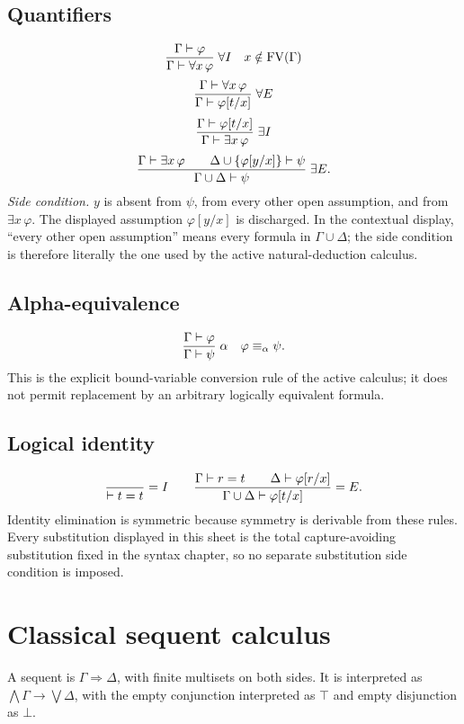 \documentclass[11pt,oneside,openany]{book}
\theoremstyle{definition}
\theoremstyle{plain}
\theoremstyle{remark}
\DeclarePairedDelimiter{\set}{\lbrace}{\rbrace}
\newcommand{\FV}{\operatorname{FV}}
\newcommand{\derives}{\vdash}
\newcommand{\bottom}{\bot}
\newcommand{\topv}{\top}
\newcommand{\Rule}[3][]{\frac{#2}{#3}\;\textsc{#1}}
\newcommand{\side}[1]{\quad\text{#1}}
\begin{document}
\subsection*{Quantifiers}
\[
\Rule[\(\forall I\)]{\Gamma\derives\varphi}
{\Gamma\derives\forall x\,\varphi}
\side{\(x\notin\FV(\Gamma)\)}
\]
\[
\Rule[\(\forall E\)]{\Gamma\derives\forall x\,\varphi}
{\Gamma\derives\varphi[t/x]}
\]
\[
\Rule[\(\exists I\)]{\Gamma\derives\varphi[t/x]}
{\Gamma\derives\exists x\,\varphi}
\]
\[
\Rule[\(\exists E\)]{
\Gamma\derives\exists x\,\varphi\qquad
\Delta\cup\set{\varphi[y/x]}\derives\psi}
{\Gamma\cup\Delta\derives\psi}.
\]
\noindent\emph{Side condition.}  \(y\) is absent from \(\psi\), from every
other open assumption, and from \(\exists x\,\varphi\).
The displayed assumption \(\varphi[y/x]\) is discharged.  In the contextual
display, ``every other open assumption'' means every formula in
\(\Gamma\cup\Delta\); the side condition is therefore literally the one used
by the active natural-deduction calculus.

\subsection*{Alpha-equivalence}
\[
\Rule[\(\alpha\)]{\Gamma\derives\varphi}{\Gamma\derives\psi}
\side{\(\varphi\equiv_\alpha\psi\)}.
\]
This is the explicit bound-variable conversion rule of the active calculus;
it does not permit replacement by an arbitrary logically equivalent
formula.

\subsection*{Logical identity}
\[
\Rule[\(=I\)]{}{\derives t=t}
\qquad
\Rule[\(=E\)]{\Gamma\derives r=t\qquad\Delta\derives\varphi[r/x]}
{\Gamma\cup\Delta\derives\varphi[t/x]}.
\]
Identity elimination is symmetric because symmetry is derivable from these
rules.  Every substitution displayed in this sheet is the total
capture-avoiding substitution fixed in the syntax chapter, so no separate
substitution side condition is imposed.

\section{Classical sequent calculus}
\label{sec:rule-sheets-02}

A sequent is \(\Gamma\Rightarrow\Delta\), with finite multisets on both sides.
It is interpreted as
\(\bigwedge\Gamma\to\bigvee\Delta\), with the empty conjunction interpreted as
\(\topv\) and empty disjunction as \(\bottom\).
\end{document}

